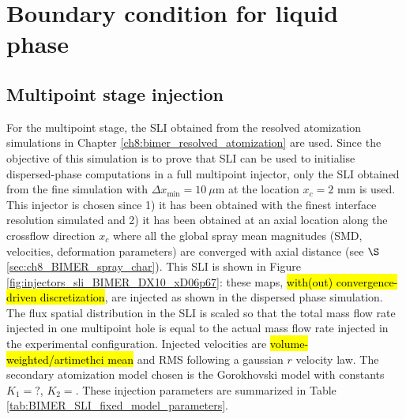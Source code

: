 
\section{Boundary condition for liquid phase}
\label{sec:ch9_BIMER_BCs_for_liquid_phase}


\subsection{Multipoint stage injection}

For the multipoint stage, the SLI obtained from the resolved atomization simulations in Chapter \ref{ch8:bimer_resolved_atomization} are used. Since the objective of this simulation is to prove that SLI can be used to initialise dispersed-phase computations in a full multipoint injector, only the SLI obtained from the fine simulation with $\Delta x_\mathrm{min} = 10~\mu$m at the location $x_c = 2$ mm is used. This injector is chosen since 1) it has been obtained with the finest interface resolution simulated and 2) it has been obtained at an axial location along the crossflow direction $x_c$ where all the global spray mean magnitudes (SMD, velocities, deformation parameters) are converged with axial distance (see $\S$ \ref{sec:ch8_BIMER_spray_char}). This SLI is shown in Figure \ref{fig:injectors_sli_BIMER_DX10_xD06p67}: these maps, \hl{with(out) convergence-driven discretization}, are injected as shown in the dispersed phase simulation. The flux spatial distribution in the SLI is scaled so that the total mass flow rate injected in one multipoint hole is equal to the actual mass flow rate injected in the experimental configuration. Injected velocities are \hl{volume-weighted/artimethci mean} and RMS following a gaussian $r$ velocity law. The secondary atomization model chosen is the Gorokhovski model with constants $K_1 = ?$, $K_2 = $. These injection parameters are summarized in Table  \ref{tab:BIMER_SLI_fixed_model_parameters}.


